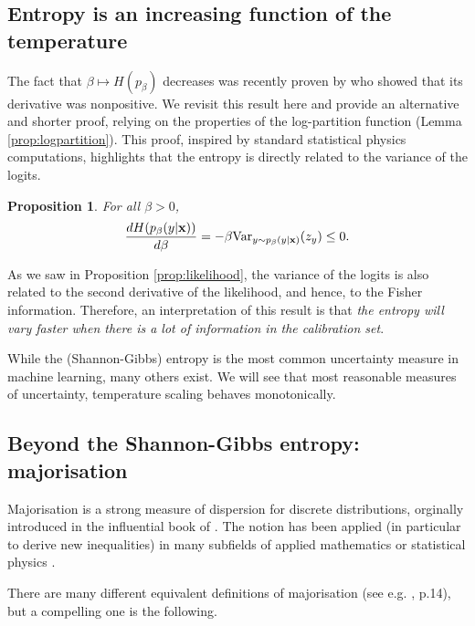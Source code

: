 \documentclass[10pt,dvipsnames]{article}
\newcommand{\bx}{\mathbf{x}}%
\theoremstyle{plain}
\newtheorem{proposition}{Proposition}
\theoremstyle{definition}
\theoremstyle{remark}
\begin{document}
\subsection{Entropy is an increasing function of the temperature}


The fact that $\beta \mapsto H(p_\beta)$ decreases was recently proven by \citet[Proposition A.5]{dabah2025temperature} who showed that its derivative was nonpositive. We revisit this result here and provide an alternative and shorter proof, relying on the properties of the log-partition function (Lemma \ref{prop:logpartition}). This proof, inspired by standard statistical physics computations, highlights that the entropy is directly related to the variance of the logits.
\begin{proposition} 
\label{prop:ent_derivative}
For all $\beta >0$,
\begin{equation}
        \frac{dH(p_\beta(y | \bx))}{d \beta}  = - \beta \textup{Var}_{y \sim p_\beta(y | \bx)} ( z_y ) \leq  0.
        \end{equation}
\end{proposition}
As we saw in Proposition \ref{prop:likelihood}, the variance of the logits is also related to the second derivative of the likelihood, and hence, to the Fisher information. Therefore, an interpretation of this result is that \emph{the entropy will vary faster when there is a lot of information in the calibration set}.

While the (Shannon-Gibbs) entropy is the most common uncertainty measure in machine learning, many others exist. We will see that most reasonable measures of uncertainty, temperature scaling behaves monotonically.





\subsection{Beyond the Shannon-Gibbs entropy: majorisation}


Majorisation is a strong measure of dispersion for discrete distributions, orginally introduced in the influential book of \citet{hardy1952inequalities}. The notion has been applied (in particular to derive new inequalities) in many subfields of applied mathematics \citep{marshall2011inequalities} or statistical physics \citep{sagawa2022entropy}.

 There are many different equivalent definitions of majorisation (see e.g. \citealp{marshall2011inequalities}, p.14), but a compelling one is the following.
\end{document}
